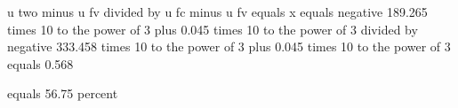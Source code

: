 u two minus u fv divided by u fc minus u fv equals x equals negative 189.265 times 10 to the power of 3 plus 0.045 times 10 to the power of 3 divided by negative 333.458 times 10 to the power of 3 plus 0.045 times 10 to the power of 3 equals 0.568  

equals 56.75 percent